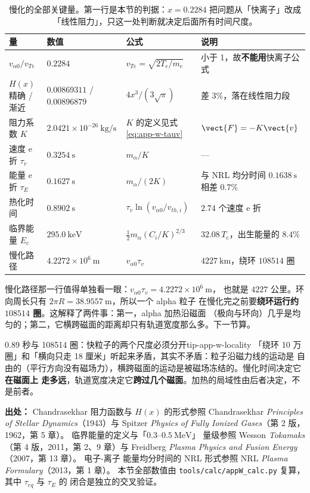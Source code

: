 \begin{table}[htbp]
\centering
\caption{慢化的全部关键量。第一行是本节的判据：$x=0.2284$ 把问题从「快离子」改成
「线性阻力」，只这一处判断就决定后面所有时间尺度。}
\label{tab:app-w-slowing}
\begin{tabular}{@{}p{3.0cm}p{2.4cm}p{3.2cm}p{4.0cm}@{}}
\hline
量 & 数值 & 公式 & 说明 \\
\hline
$v_{\alpha 0}/v_{Te}$ & $0.2284$ & $v_{Te}=\sqrt{2T_e/m_e}$ &
小于 1，故\textbf{不能用}快离子公式 \\
$H(x)$ 精确 / 渐近 & $0.00869311$ / $0.00896879$ & $4x^3/(3\sqrt{\pi})$ &
差 $3\%$，落在线性阻力段 \\
阻力系数 $K$ & $2.0421\times10^{-26}\ \mathrm{kg/s}$ &
$K$ 的定义见式 \eqref{eq:app-w-tauv} &
$\vect{F}=-K\vect{v}$ \\
速度 e 折 $\tau_v$ & $0.3254\ \mathrm{s}$ & $m_\alpha/K$ & — \\
能量 e 折 $\tau_E$ & $0.1627\ \mathrm{s}$ & $m_\alpha/(2K)$ &
与 NRL 均分时间 $0.1638\ \mathrm{s}$ 相差 $0.7\%$ \\
热化时间 & $0.8902\ \mathrm{s}$ & $\tau_v\ln(v_{\alpha 0}/v_{th,i})$ &
$2.74$ 个速度 e 折 \\
临界能量 $E_c$ & $295.0\ \mathrm{keV}$ & $\frac12 m_\alpha(C_i/K)^{2/3}$ &
$32.08\,T_e$，出生能量的 $8.4\%$ \\
慢化路径 & $4.2272\times10^{6}\ \mathrm{m}$ & $v_{\alpha 0}\tau_v$ &
$4227\ \mathrm{km}$，绕环 $108514$ 圈 \\
\hline
\end{tabular}

\end{table}

慢化路径那一行值得单独看一眼：$v_{\alpha 0}\tau_v=4.2272\times10^{6}\ \mathrm{m}$，
也就是 $4227$ 公里。环向周长只有 $2\pi R=38.9557\ \mathrm{m}$，所以一个 alpha 粒子
在慢化完之前要\textbf{绕环运行约 $108514$ 圈}。这解释了两件事：第一，alpha 加热沿磁面
（极向与环向）几乎是均匀的；第二，它横跨磁面的距离却只有轨道宽度那么多。下一节算。

\begin{tip}{0.89 秒与 108514 圈：快粒子的两个尺度必须分开}{tip-app-w-locality}
「绕环 10 万圈」和「横向只走 18 厘米」听起来矛盾，其实不矛盾：粒子沿磁力线的运动是
自由的（平行方向没有磁场力），横跨磁面的运动是被磁场冻结的。慢化时间决定它\textbf{在磁面上
走多远}，轨道宽度决定它\textbf{跨过几个磁面}。加热的局域性由后者决定，不是前者。
\end{tip}

{\footnotesize
\textbf{出处：} Chand\-ra\-sekhar 阻力函数与 $H(x)$ 的形式参照 Chand\-ra\-sekhar
\textit{Principles of Stellar Dynamics}（1943）与 Spitzer \textit{Physics of Fully
Ionized Gases}（第 2 版，1962，第 5 章）。
临界能量的定义与「$0.3$--$0.5\ \mathrm{MeV}$」
量级参照 Wesson \textit{Tokamaks}（第 4 版，2011，第 2、9 章）与
Freidberg \textit{Plasma Physics and Fusion Energy}（2007，第 13 章）。
电子-离子
能量均分时间的 NRL 形式参照 NRL \textit{Plasma Formulary}（2013，第 1 章）。
本节全部数值由 \texttt{tools/\allowbreak{}calc/\allowbreak{}appW\_calc.py} 复算，其中 $\tau_{eq}$ 与 $\tau_E$ 的
闭合是独立的交叉验证。
}

